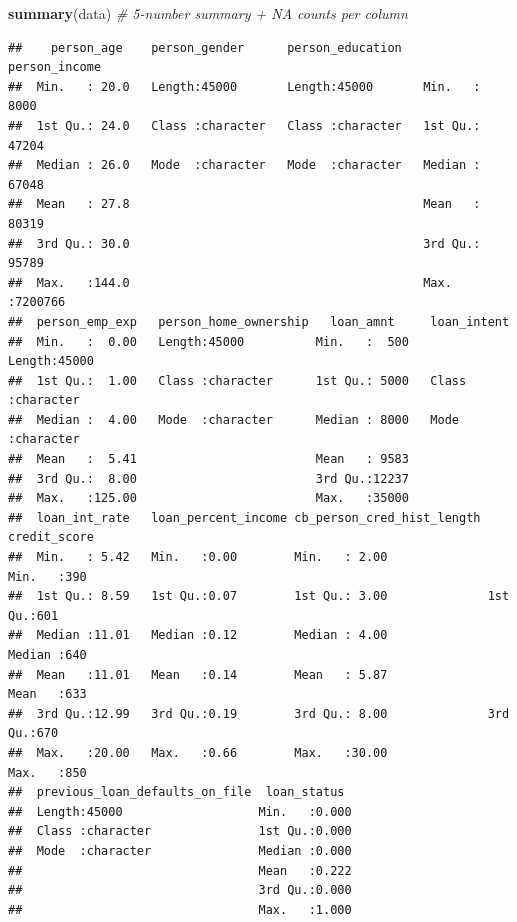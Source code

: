 \documentclass[
]{article}
\newenvironment{Shaded}{\begin{snugshade}}{\end{snugshade}}
\newcommand{\CommentTok}[1]{\textcolor[rgb]{0.56,0.35,0.01}{\textit{#1}}}
\newcommand{\FunctionTok}[1]{\textcolor[rgb]{0.13,0.29,0.53}{\textbf{#1}}}
\newcommand{\NormalTok}[1]{#1}
\begin{document}
\begin{Shaded}
\begin{Highlighting}[]
\FunctionTok{summary}\NormalTok{(data)               }\CommentTok{\# 5{-}number summary + NA counts per column}
\end{Highlighting}
\end{Shaded}

\begin{verbatim}
##    person_age    person_gender      person_education   person_income    
##  Min.   : 20.0   Length:45000       Length:45000       Min.   :   8000  
##  1st Qu.: 24.0   Class :character   Class :character   1st Qu.:  47204  
##  Median : 26.0   Mode  :character   Mode  :character   Median :  67048  
##  Mean   : 27.8                                         Mean   :  80319  
##  3rd Qu.: 30.0                                         3rd Qu.:  95789  
##  Max.   :144.0                                         Max.   :7200766  
##  person_emp_exp   person_home_ownership   loan_amnt     loan_intent       
##  Min.   :  0.00   Length:45000          Min.   :  500   Length:45000      
##  1st Qu.:  1.00   Class :character      1st Qu.: 5000   Class :character  
##  Median :  4.00   Mode  :character      Median : 8000   Mode  :character  
##  Mean   :  5.41                         Mean   : 9583                     
##  3rd Qu.:  8.00                         3rd Qu.:12237                     
##  Max.   :125.00                         Max.   :35000                     
##  loan_int_rate   loan_percent_income cb_person_cred_hist_length  credit_score
##  Min.   : 5.42   Min.   :0.00        Min.   : 2.00              Min.   :390  
##  1st Qu.: 8.59   1st Qu.:0.07        1st Qu.: 3.00              1st Qu.:601  
##  Median :11.01   Median :0.12        Median : 4.00              Median :640  
##  Mean   :11.01   Mean   :0.14        Mean   : 5.87              Mean   :633  
##  3rd Qu.:12.99   3rd Qu.:0.19        3rd Qu.: 8.00              3rd Qu.:670  
##  Max.   :20.00   Max.   :0.66        Max.   :30.00              Max.   :850  
##  previous_loan_defaults_on_file  loan_status   
##  Length:45000                   Min.   :0.000  
##  Class :character               1st Qu.:0.000  
##  Mode  :character               Median :0.000  
##                                 Mean   :0.222  
##                                 3rd Qu.:0.000  
##                                 Max.   :1.000
\end{verbatim}
\end{document}
